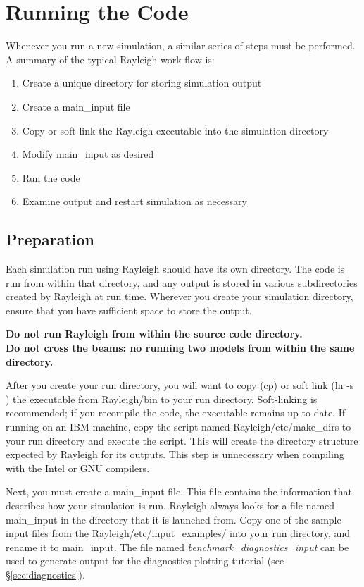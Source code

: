 \clearpage
\section{Running the Code}
Whenever you run a new simulation, a similar series of steps must be performed.  A summary of the typical Rayleigh work flow is:
\begin{enumerate}
\item Create a unique directory for storing simulation output
\item Create a main\_input file
\item Copy or soft link the Rayleigh executable into the simulation directory
\item Modify main\_input as desired
\item Run the code
\item Examine output and restart simulation as necessary
\end{enumerate}

\subsection{Preparation}
Each simulation run using Rayleigh should have its own directory.  The code is run from within that directory, and any output is stored in various subdirectories created by Rayleigh at run time.  Wherever you create your simulation directory, ensure that you have sufficient space to store the output.

\textbf{Do not run Rayleigh from within the source code directory.
\\ 
Do not cross the beams: no running two models from within the same directory.}

After you create your run directory, you will want to copy (cp) or soft link (ln -s ) the executable from Rayleigh/bin to your run directory.  Soft-linking is recommended; if you recompile the code, the executable remains up-to-date.  If running on an IBM machine, copy the script named Rayleigh/etc/make\_dirs to your run directory and execute the script.  This will create the directory structure expected by Rayleigh for its outputs.  This step is unnecessary when compiling with the Intel or GNU compilers.

Next, you must create a main\_input file.  This file contains the information that describes how your simulation is run.  Rayleigh always looks for a file named main\_input in the directory that it is launched from.  Copy one of the sample input files from the Rayleigh/etc/input\_examples/ into your run directory, and rename it to main\_input.  The file named \textit{benchmark\_diagnostics\_input} can be used to generate output for the diagnostics plotting tutorial (see \S \ref{sec:diagnostics}). 

